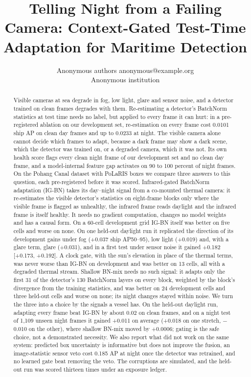 \documentclass[10pt]{article}
\title{Telling Night from a Failing Camera: Context-Gated Test-Time Adaptation for Maritime Detection}
\author{\name Anonymous authors \email anonymous@example.org \\
      \addr Anonymous institution}
\begin{document}
\maketitle

\begin{abstract}
Visible cameras at sea degrade in fog, low light, glare and sensor noise, and a detector trained on clean frames degrades with them. Re-estimating a detector's BatchNorm statistics at test time needs no label, but applied to every frame it can hurt: in a pre-registered ablation on our development set, re-estimation on every frame cost 0.0101 ship AP on clean day frames and up to 0.0233 at night. The visible camera alone cannot decide which frames to adapt, because a dark frame may show a dark scene, which the detector was trained on, or a degraded camera, which it was not. Its own health score flags every clean night frame of our development set and no clean day frame, and a model-internal feature gap activates on 90 to 100 percent of night frames. On the Pohang Canal dataset with PoLaRIS boxes we compare three answers to this question, each pre-registered before it was scored. Infrared-gated BatchNorm adaptation (IG-BN) takes its day--night signal from a co-mounted thermal camera: it re-estimates the visible detector's statistics on eight-frame blocks only where the visible frame is flagged as unhealthy, the infrared frame reads daylight and the infrared frame is itself healthy. It needs no gradient computation, changes no model weights and has a causal form. On a 60-cell development grid IG-BN itself was better on five cells and worse on none. On one held-out daylight run it replicated the direction of its development gains under fog (+0.037 ship AP50--95), low light (+0.019) and, with a glare term, glare (+0.031), and in a first test under sensor noise it gained +0.182 [+0.173, +0.192]. A clock gate, with the sun's elevation in place of the thermal terms, was never worse than IG-BN on development and was better on 13 cells, all with a degraded thermal stream. Shallow BN-mix needs no such signal: it adapts only the first 31 of the detector's 130 BatchNorm layers on every block, weighted by the block's divergence from the training statistics, and was better on 24 development cells and three held-out cells and worse on none; its night changes stayed within noise. We turn the three into a choice by the signals a vessel has. On the held-out daylight run, adapting every frame beat IG-BN by about 0.02 on clean frames, and on a night test of 1,109 unseen night frames it gained +0.011 on average (+0.018 on one stretch, $-$0.010 on the other), where shallow BN-mix moved by +0.0006; gating is the safe choice, not a demonstrated necessity. We also report what did not work on the same system: predicted box uncertainty is informative but does not improve the fusion, an image-statistic sensor veto cost 0.185 AP at night once the detector was retrained, and no learned gate beat removing the veto. The corruptions are simulated, and the held-out run was scored thirteen times under an exposure ledger.
\end{abstract}
\end{document}
